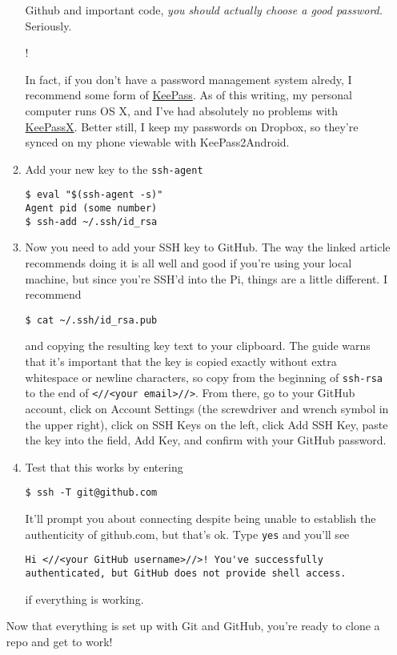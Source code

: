 \documentclass[12pt,letterpaper]{article}
\newenvironment{seriously}{%
  \begin{center}%
    \begin{minipage}[c]{2em}\Huge !\end{minipage}%
    \begin{minipage}[c]{0.75\textwidth}%
      \noindent}
    {%
    \end{minipage}%
  \end{center}%
  \smallskip%
  \ignorespacesafterend}
\begin{document}
\begin{enumerate}
\begin{enumerate}
        Github and important code, \emph{you should actually choose a good
        password.}  Seriously.
      \begin{seriously}In fact, if you don't have a password management
        system alredy, I recommend some form of
        \href{http://keepass.info/}{KeePass}.  As of this writing, my personal
        computer runs OS X, and I've had absolutely no problems with
        \href{http://www.keepassx.org/}{KeePassX}.  Better still, I keep my
        passwords on Dropbox, so they're synced on my phone viewable with
        KeePass2Android.\end{seriously}
      \item Add your new key to the \lstinline{ssh-agent}
        \begin{lstlisting}
$ eval "$(ssh-agent -s)"
Agent pid (some number)
$ ssh-add ~/.ssh/id_rsa
        \end{lstlisting}
        \item Now you need to add your SSH key to GitHub.  The way the linked
          article recommends doing it is all well and good if you're using your
          local machine, but since you're SSH'd into the Pi, things are a
          little different.  I recommend
          \begin{lstlisting}
$ cat ~/.ssh/id_rsa.pub
          \end{lstlisting}
          and copying the resulting key text to your clipboard.  The guide
          warns that it's important that the key is copied exactly without
          extra whitespace or newline characters, so copy from the beginning of
          \lstinline{ssh-rsa} to the end of \lstinline{<//<your email>//>}.
          From there, go to your GitHub account, click on Account Settings (the
          screwdriver and wrench symbol in the upper right), click on SSH Keys
          on the left, click Add SSH Key, paste the key into the field, Add
          Key, and confirm with your GitHub password.
        \item Test that this works by entering
          \begin{lstlisting}
$ ssh -T git@github.com       
          \end{lstlisting}
          It'll prompt you about connecting despite being unable to establish
          the authenticity of github.com, but that's ok.  Type \lstinline{yes}
          and you'll see
          \begin{lstlisting}
Hi <//<your GitHub username>//>! You've successfully authenticated, but GitHub does not provide shell access.
          \end{lstlisting}
          if everything is working.
        \end{enumerate}
        Now that everything is set up with Git and GitHub, you're ready to
        clone a repo and get to work!
\end{enumerate}
\end{document}
